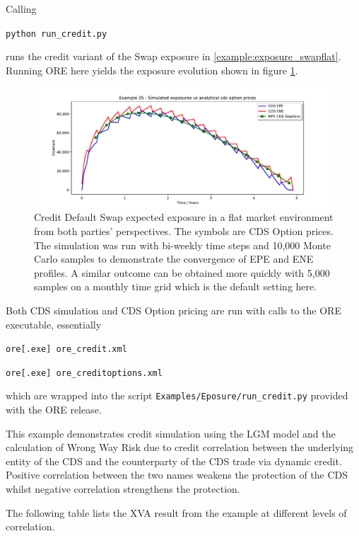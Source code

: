 Calling

\medskip
\centerline{\tt python run\_credit.py } 
\medskip

runs the credit variant of the Swap exposure in \ref{example:exposure_swapflat}.
Running ORE here yields the exposure evolution shown in figure \ref{fig_33}. 
\begin{figure}[h!]
\begin{center}
\includegraphics[scale=0.45]{examples/mpl_cds_33_2w_10k.pdf}
\end{center}
\caption{Credit Default Swap expected exposure in a flat market environment from both parties' perspectives. The symbols are CDS Option prices. The simulation was run with bi-weekly time steps and 10,000 Monte Carlo samples to demonstrate the convergence of EPE and ENE profiles. A similar
outcome can be obtained more quickly with 5,000 samples on a monthly time grid which is the default setting  here. }
\label{fig_33}
\end{figure}
Both CDS simulation and CDS Option pricing are run with calls to the ORE executable, essentially 

\medskip
\centerline{\tt ore[.exe] ore\_credit.xml} 

\centerline{\tt ore[.exe] ore\_creditoptions.xml} 
\medskip

which are wrapped into the script {\tt Examples/Eposure/run\_credit.py} provided with the ORE release.

This example demonstrates credit simulation using the LGM model and the calculation of Wrong Way Risk due to credit
correlation between the underlying entity of the CDS and the counterparty of the CDS trade via dynamic credit.
Positive correlation between the two names weakens the protection of the CDS whilst
negative correlation strengthens the protection.

The following table lists the XVA result from the example at different levels of correlation.

